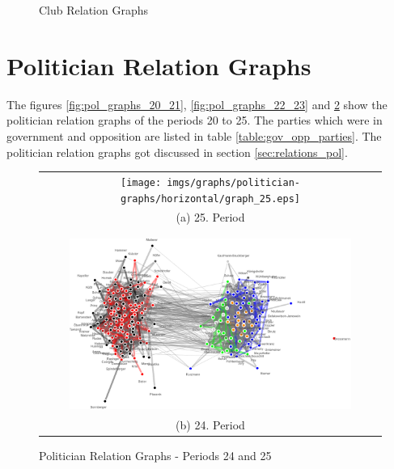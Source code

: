 \begin{figure}[h!]
\begin{tabular}{ c | c }
	\end{tabular}

	\caption{Club Relation Graphs}
	\label{fig:all_club_graphs}
\end{figure}

\section{Politician Relation Graphs}

The figures \ref{fig:pol_graphs_20_21}, \ref{fig:pol_graphs_22_23} and \ref{fig:pol_graphs_24_25} show the politician relation graphs of the periods 20 to 25. The parties which were in government and opposition are listed in table \ref{table:gov_opp_parties}. The politician relation graphs got discussed in section \ref{sec:relations_pol}.

\begin{figure}
\center
\begin{tabular}{ c }
	\texttt{[image: imgs/graphs/politician-graphs/horizontal/graph\_25.eps]}
	\\
	(a) 25. Period
	\\
	\\
	\hline
	\\
	\includegraphics[width=0.85\textwidth]{imgs/graphs/politician-graphs/horizontal/graph_24.eps}
	\\
	(b) 24. Period
	
\end{tabular}
	
	
	\caption{Politician Relation Graphs - Periods 24 and 25}
	\label{fig:pol_graphs_24_25}
\end{figure}

